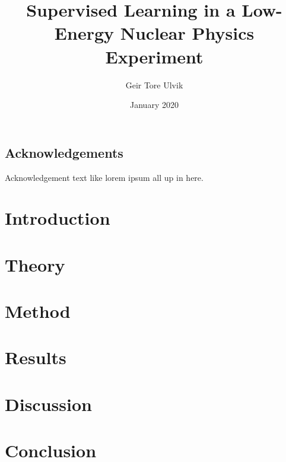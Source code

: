 \documentclass[twoside,english]{uiofysmaster}
\author{Geir Tore Ulvik}
\title{Supervised Learning in a Low-Energy Nuclear Physics Experiment}
\date{January 2020}
\begin{document}
\maketitle

\tableofcontents
\listoffigures

\newpage
\section*{Acknowledgements}
Acknowledgement text like lorem ipsum all up in here.
\newpage



\chapter{Introduction}

\chapter{Theory}

\chapter{Method}

\chapter{Results}

\chapter{Discussion}

\chapter{Conclusion}




\end{document}
